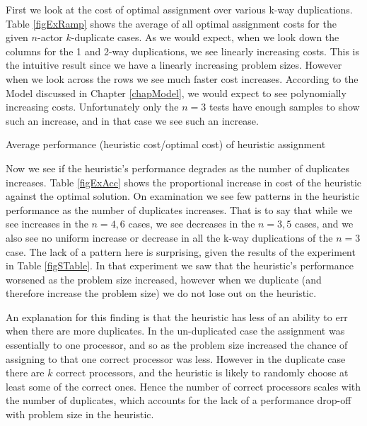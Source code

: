 First we look at the cost of optimal assignment over various k-way duplications.
Table \ref{figExRamp} shows the average of all optimal assignment costs for the given $n$-actor $k$-duplicate cases.
As we would expect, when we look down the columns for the 1 and 2-way duplications, we see linearly increasing costs.
This is the intuitive result since we have a linearly increasing problem sizes.
However when we look across the rows we see much faster cost increases.
According to the Model discussed in Chapter \ref{chapModel}, we would expect to see polynomially increasing costs.
Unfortunately only the $n = 3$ tests have enough samples to show such an increase, and in that case we see such an increase.

\begin{table}
\begin{center}
	
\caption{Average performance (heuristic cost/optimal cost) of heuristic assignment}
\label{figExAcc}
\end{center}
\end{table}

Now we see if the heuristic's performance degrades as the number of duplicates increases.
Table \ref{figExAcc} shows the proportional increase in cost of the heuristic against the optimal solution.
On examination we see few patterns in the heuristic performance as the number of duplicates increases.
That is to say that while we see increases in the $n=4, 6$ cases, we see decreases in the $n=3, 5$ cases, and we also see no uniform increase or decrease in all the k-way duplications of the $n=3$ case.
The lack of a pattern here is surprising, given the results of the experiment in Table \ref{figSTable}.
In that experiment we saw that the heuristic's performance worsened as the problem size increased, however when we duplicate (and therefore increase the problem size) we do not lose out on the heuristic.

An explanation for this finding is that the heuristic has less of an ability to err when there are more duplicates.
In the un-duplicated case the assignment was essentially to one processor, and so as the problem size increased the chance of assigning to that one correct processor was less.
However in the duplicate case there are $k$ correct processors, and the heuristic is likely to randomly choose at least some of the correct ones.
Hence the number of correct processors scales with the number of duplicates, which accounts for the lack of a performance drop-off with problem size in the heuristic.

